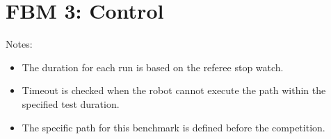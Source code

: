 \section*{FBM 3: Control}


\noindent Notes:
\begin{itemize}
\item The duration for each run is based on the referee stop watch.
\item Timeout is checked when the robot cannot execute the path within the specified test duration.
\item The specific path for this benchmark is defined before the competition.
\end{itemize}

\vspace{0.5cm}




